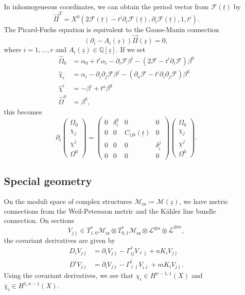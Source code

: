 \documentclass[10pt,oldfontcommands,oneside]{memoir}
\theoremstyle{definition}
\theoremstyle{remark}
\theoremstyle{plain}
\theoremstyle{definition}
\theoremstyle{remark}
\newcommand{\Q}{\mathbb{Q}}
\newcommand{\M}{\mathcal{M}}
\newcommand{\mc}[1]{\mathcal{#1}}
\newcommand{\ut}{\ul{t}}
\newcommand{\uz}{\ul{z}}
\newcommand{\ms}[1]{\mathsf{#1}}
\newcommand{\ul}[1]{\underline{#1}}
\newcommand{\1}{\mathbf{1}}
\newcommand{\2}{\mathbf{2}}
\newcommand{\3}{\mathbf{3}}
\newcommand{\scs}{\ms{cs}}
\begin{document}
In inhomogeneous coordinates, we can obtain the period vector from $\mc{F}(\ut)$ by
\[ \vec{\Pi}^T = X^0 (2 \mc{F}(\ut) - t^i \partial_i \mc{F}(\ut), \partial_i \mc{F}(\ut), 1, t^i). \]
The Picard-Fuchs equation is equivalent to the Gauss-Manin connection
\[ (\partial_i - A_i(\uz)) \vec{\Pi}(\uz) = 0, \]
where $i = 1,\ldots,r$ and $A_i(\uz) \in \Q[\uz]$. If we set
\begin{align*}
    \hat{\Omega}_0 &= \alpha_0 + t^i \alpha_i - \partial_i \mc{F}\beta^i -(2 \mc{F} -t^i \partial_i \mc{F}) \beta^0 \\
    \hat{\chi}_i &= \alpha_i - \partial_i \partial_j \mc{F} \beta^j - (\partial_a \mc{F} - t^i \partial_i \partial_j \mc{F})\beta^0 \\
    \hat{\chi}^i &= -\beta^i + t^a \beta^0 \\
    \hat{\Omega}^0 &= \beta^0,
\end{align*}
this becomes
\[ \partial_i \begin{pmatrix}
    \Omega_0 \\ \chi_j \\ \chi^j \\ \Omega^0
\end{pmatrix} = \begin{pmatrix}
    0 & \delta_i^k & 0 & 0 \\
    0 & 0 & C_{ijk}(\ut) & 0 \\
    0 & 0 & 0 & \delta_i^j \\
    0 & 0 & 0 & 0
\end{pmatrix} \begin{pmatrix}
    \Omega_0 \\ \chi_j \\ \chi^j \\ \Omega^0
\end{pmatrix}.
\]

\subsection{Special geometry}%
\label{sub:Special geometry}

On the moduli space of complex structures $\mc{M}_{\scs} \coloneqq \mc{M}(\uz)$, we have metric connections from the Weil-Petersson metric and the K\"ahler line bundle connection. On sections
\[ V_{j\bar{\jmath}} \in T^*_{1,0}\M_{\scs} \otimes T^*_{0,1}\M_{\scs} \otimes \mc{L}^{\otimes n} \otimes \bar{\mc{L}}^{\otimes m}, \]
the covariant derivatives are given by
\begin{align*}
    D_i V_{j\bar{\jmath}} &= \partial_i V_{j\bar{\jmath}} - \Gamma^{\ell}_{ij} V_{\ell\bar{\jmath}} + n K_i V_{j\bar{\jmath}} \\
    D^i V_{j\bar{\jmath}} &= \partial_{\bar{\imath}} V_{j\bar{\jmath}} - \Gamma^{\bar{\ell}}_{\bar{\imath}\bar{\jmath}} V_{i\bar{\ell}} + m K_{\bar{\imath}} V_{j\bar{\jmath}}.
\end{align*}
Using the covariant derivatives, we see that 
$\chi_i \in H^{n-1,1}(X)$ and $\bar{\chi}_{\bar{\imath}} \in H^{1,n-1}(X)$. 
\end{document}

